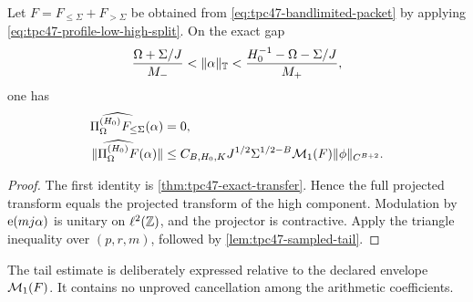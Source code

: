 \begin{theorem}
\label{thm:tpc47-core-tail-transfer}
Let \(F=F_{\le\Sigma}+F_{>\Sigma}\) be obtained from
\eqref{eq:tpc47-bandlimited-packet} by applying
\eqref{eq:tpc47-profile-low-high-split}.  On the exact gap
\begin{equation}
 \frac{\Omega+\Sigma/J}{M_-}
 <\|\alpha\|_{\mathbb T}<
 \frac{H_0^{-1}-\Omega-\Sigma/J}{M_+},
 \label{eq:tpc47-core-exact-gap}
\end{equation}
one has
\begin{align}
 \widehat{\Pi_{\Omega}^{(H_0)}F_{\le\Sigma}}(\alpha)&=0,
 \label{eq:tpc47-core-zero}\\
 \|\widehat{\Pi_{\Omega}^{(H_0)}F}(\alpha)\|
 &\le
 C_{B,H_0,K}J^{1/2}\Sigma^{1/2-B}
 \mathcal M_1(F)\|\phi\|_{C^{B+2}}.
 \label{eq:tpc47-tail-leakage-envelope}
\end{align}
\end{theorem}

\begin{proof}
The first identity is \cref{thm:tpc47-exact-transfer}.  Hence the full
projected transform equals the projected transform of the high
component.  Modulation by \(\mathrm e(mj\alpha)\) is unitary on
\(\ell^2(\mathbb Z)\), and the projector is contractive.  Apply the triangle
inequality over \((p,r,m)\), followed by
\cref{lem:tpc47-sampled-tail}.
\end{proof}

The tail estimate is deliberately expressed relative to the declared
envelope \(\mathcal M_1(F)\).  It contains no unproved cancellation among the
arithmetic coefficients.
